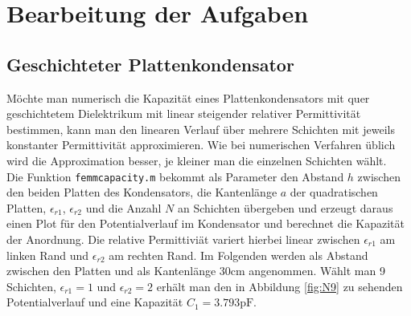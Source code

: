 \chapter{Bearbeitung der Aufgaben}
\section{Geschichteter Plattenkondensator}

Möchte man numerisch die Kapazität eines Plattenkondensators mit quer geschichtetem Dielektrikum mit linear steigender relativer Permittivität bestimmen, kann man den linearen Verlauf über mehrere Schichten mit jeweils konstanter Permittivität approximieren. Wie bei numerischen Verfahren üblich wird die Approximation besser, je kleiner man die einzelnen Schichten wählt.\\
Die Funktion \texttt{femmcapacity.m} bekommt als Parameter den Abstand $h$ zwischen den beiden Platten des Kondensators, die Kantenlänge $a$ der quadratischen Platten, $\epsilon_{r1}$, $\epsilon_{r2}$ und die Anzahl $N$ an Schichten übergeben und erzeugt daraus einen Plot für den Potentialverlauf im Kondensator und berechnet die Kapazität der Anordnung. Die relative Permittiviät variert hierbei linear zwischen $\epsilon_{r1} $ am linken Rand und $\epsilon_{r2}$ am rechten Rand. Im Folgenden werden als Abstand zwischen den Platten und als Kantenlänge 30cm angenommen. Wählt man 9 Schichten, $\epsilon_{r1} = 1$ und $\epsilon_{r2} = 2$  erhält man den in Abbildung \ref{fig:N9} zu sehenden Potentialverlauf und eine Kapazität $ C_1 = \num{3,793}\si{\pico\farad}$.

